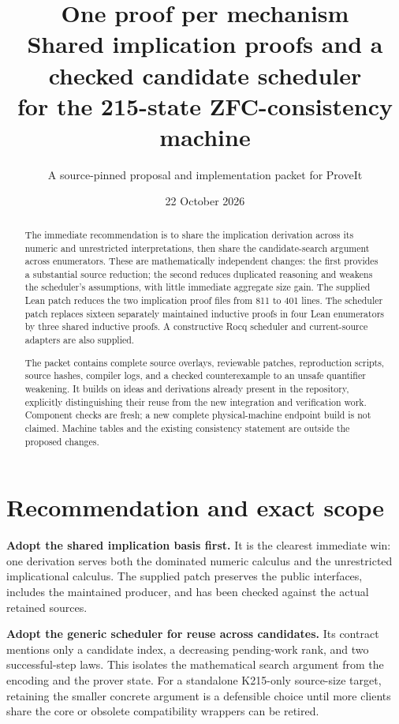 \documentclass[11pt]{article}
\title{\vspace{-1.0em}\textbf{One proof per mechanism}\\[0.35em]
\large Shared implication proofs and a checked candidate scheduler\\
\large for the 215-state ZFC-consistency machine}
\author{A source-pinned proposal and implementation packet for ProveIt}
\date{22 October 2026}
\begin{document}
\maketitle
\vspace{-1em}
\begin{abstract}
The immediate recommendation is to share the implication derivation across its
numeric and unrestricted interpretations, then share the candidate-search
argument across enumerators. These are mathematically independent changes: the first provides
a substantial source reduction; the second reduces duplicated reasoning and
weakens the scheduler's assumptions, with little immediate aggregate size gain.
The supplied Lean patch reduces the two implication proof files from 811 to 401
lines. The scheduler patch replaces sixteen separately maintained inductive
proofs in four Lean enumerators by three shared inductive proofs. A constructive
Rocq scheduler and current-source adapters are also supplied.

The packet contains complete source overlays, reviewable patches, reproduction
scripts, source hashes, compiler logs, and a checked counterexample to an unsafe
quantifier weakening. It builds on ideas and derivations already present in the
repository, explicitly distinguishing their reuse from the new integration and
verification work. Component checks are fresh; a new complete physical-machine
endpoint build is not claimed. Machine tables and the existing consistency
statement are outside the proposed changes.
\end{abstract}

\section{Recommendation and exact scope}
\label{sec:recommendation}

\textbf{Adopt the shared implication basis first.} It is the clearest immediate
win: one derivation serves both the dominated numeric calculus and the
unrestricted implicational calculus. The supplied patch preserves the public
interfaces, includes the maintained producer, and has been checked against the
actual retained sources.

\textbf{Adopt the generic scheduler for reuse across candidates.} Its contract
mentions only a candidate index, a decreasing pending-work rank, and two
successful-step laws. This isolates the mathematical search argument from the
encoding and the prover state. For a standalone K215-only source-size target,
retaining the smaller concrete argument is a defensible choice until more
clients share the core or obsolete compatibility wrappers can be retired.
\end{document}
